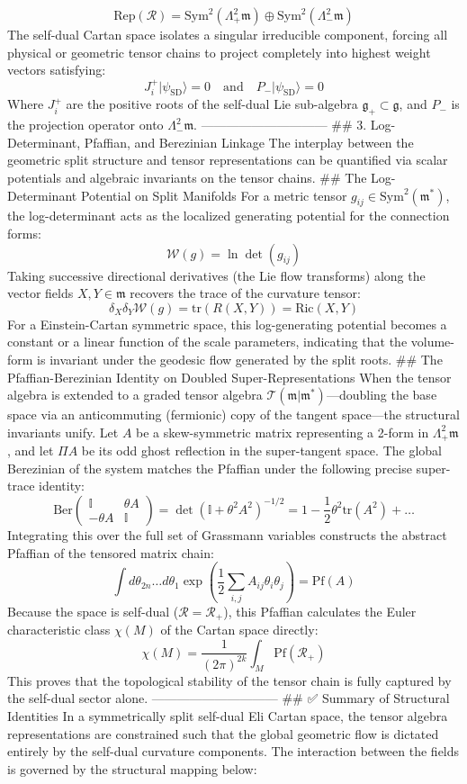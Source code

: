 $$\text{Rep}(\mathcal{R}) = \text{Sym}^2(\Lambda^2_+ \mathfrak{m}) \oplus \text{Sym}^2(\Lambda^2_- \mathfrak{m})$$ 
The self-dual Cartan space isolates a singular irreducible component, forcing all physical or geometric tensor chains to project completely into highest weight vectors satisfying:
$$J_i^+ \vert \psi_{\text{SD}} \rangle = 0 \quad \text{and} \quad P_- \vert \psi_{\text{SD}} \rangle = 0$$ 
Where $J_i^+$ are the positive roots of the self-dual Lie sub-algebra $\mathfrak{g}_+ \subset \mathfrak{g}$, and $P_-$ is the projection operator onto $\Lambda^2_- \mathfrak{m}$.
------------------------------
## 3. Log-Determinant, Pfaffian, and Berezinian Linkage
The interplay between the geometric split structure and tensor representations can be quantified via scalar potentials and algebraic invariants on the tensor chains.
## The Log-Determinant Potential on Split Manifolds
For a metric tensor $g_{ij} \in \text{Sym}^2(\mathfrak{m}^*)$, the log-determinant acts as the localized generating potential for the connection forms:
$$\mathcal{W}(g) = \ln \det(g_{ij})$$ 
Taking successive directional derivatives (the Lie flow transforms) along the vector fields $X, Y \in \mathfrak{m}$ recovers the trace of the curvature tensor:
$$\delta_X \delta_Y \mathcal{W}(g) = \text{tr}(R(X, Y)) = \text{Ric}(X, Y)$$ 
For a Einstein-Cartan symmetric space, this log-generating potential becomes a constant or a linear function of the scale parameters, indicating that the volume-form is invariant under the geodesic flow generated by the split roots.
## The Pfaffian-Berezinian Identity on Doubled Super-Representations
When the tensor algebra is extended to a graded tensor algebra $\mathcal{T}(\mathfrak{m} \vert \mathfrak{m}^*)$—doubling the base space via an anticommuting (fermionic) copy of the tangent space—the structural invariants unify.
Let $A$ be a skew-symmetric matrix representing a 2-form in $\Lambda^2_+ \mathfrak{m}$, and let $\Pi A$ be its odd ghost reflection in the super-tangent space. The global Berezinian of the system matches the Pfaffian under the following precise super-trace identity:
$$\text{Ber}\begin{pmatrix} \mathbb{I} & \theta A \\ -\theta A & \mathbb{I} \end{pmatrix} = \det(\mathbb{I} + \theta^2 A^2)^{-1/2} = 1 - \frac{1}{2}\theta^2 \text{tr}(A^2) + \dots$$ 
Integrating this over the full set of Grassmann variables constructs the abstract Pfaffian of the tensored matrix chain:
$$\int d\theta_{2n}\dots d\theta_1 \exp\left(\frac{1}{2}\sum_{i,j} A_{ij}\theta_i \theta_j\right) = \text{Pf}(A)$$ 
Because the space is self-dual ($\mathcal{R} = \mathcal{R}_+$), this Pfaffian calculates the Euler characteristic class $\chi(M)$ of the Cartan space directly:
$$\chi(M) = \frac{1}{(2\pi)^{2k}} \int_M \text{Pf}(\mathcal{R}_+)$$ 
This proves that the topological stability of the tensor chain is fully captured by the self-dual sector alone.
------------------------------
## ✅ Summary of Structural Identities
In a symmetrically split self-dual Eli Cartan space, the tensor algebra representations are constrained such that the global geometric flow is dictated entirely by the self-dual curvature components. The interaction between the fields is governed by the structural mapping below:

